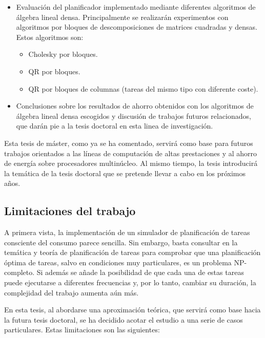 \begin{itemize}
\item Evaluación del planificador implementado mediante diferentes
algoritmos de álgebra lineal densa. Principalmente se realizarán experimentos
con algoritmos por bloques de descomposiciones de matrices cuadradas y densas. Estos algoritmos
son:

\begin{itemize}
\item Cholesky por bloques.
\item QR por bloques.
\item QR por bloques de columnas (tareas del mismo tipo con diferente coste).
\end{itemize}

\item Conclusiones sobre los resultados de ahorro obtenidos con los algoritmos de álgebra 
lineal densa escogidos y discusión de trabajos futuros relacionados, que darán pie a la 
tesis doctoral en esta linea de investigación.

\end{itemize}

Esta tesis de máster, como ya se ha comentado, servirá como base para futuros trabajos orientados
a las líneas de computación de altas prestaciones y al ahorro de energía sobre
procesadores multinúcleo. Al mismo tiempo, la tesis introducirá la temática de
la tesis doctoral que se pretende llevar a cabo en los próximos años.

\subsection{Limitaciones del trabajo\label{limitaciones}}

A primera vista, la implementación de un simulador de planificación de tareas
consciente del consumo parece sencilla. Sin embargo, basta consultar en la temática y teoría
de planificación de tareas para comprobar que una planificación óptima de tareas, salvo en condiciones muy particulares,
es un problema NP-completo. Si además se añade la posibilidad de que cada una de 
estas tareas puede ejecutarse a diferentes frecuencias y, por lo tanto,
cambiar su duración, la complejidad del trabajo aumenta aún más. 

En esta tesis, al abordarse una aproximación teórica, que servirá como base hacia 
la futura tesis doctoral, se ha decidido acotar el estudio a una serie de casos particulares. 
Estas limitaciones son las siguientes:

